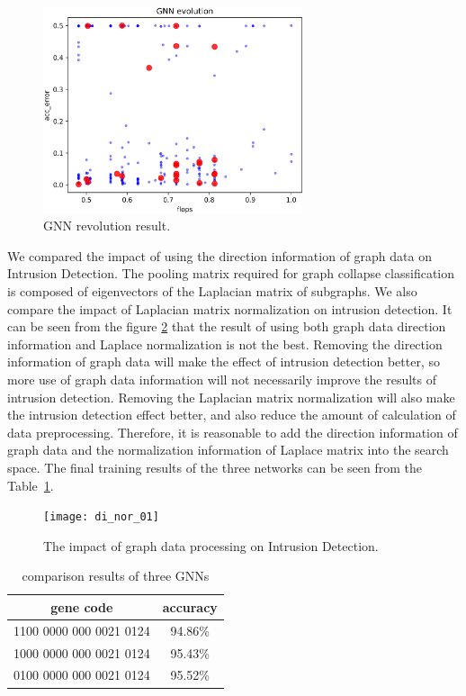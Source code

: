 \documentclass[lettersize,journal]{IEEEtran}
\begin{document}
\begin{figure}[!t]
\centering
\includegraphics[width=3in]{gnn_evo}
\caption{GNN revolution result.}
\label{fig_10}
\end{figure}

We compared the impact of using the direction information of graph data on Intrusion Detection. The pooling matrix required for graph collapse classification is composed of eigenvectors of the Laplacian matrix of subgraphs. We also compare the impact of Laplacian matrix normalization on intrusion detection. It can be seen from the figure \ref{fig_11} that the result of using both graph data direction information and Laplace normalization is not the best. Removing the direction information of graph data will make the effect of intrusion detection better, so more use of graph data information will not necessarily improve the results of intrusion detection. Removing the Laplacian matrix normalization will also make the intrusion detection effect better, and also reduce the amount of calculation of data preprocessing. Therefore, it is reasonable to add the direction information of graph data and the normalization information of Laplace matrix into the search space. The final training results of the three networks can be seen from the Table~\ref{table4}.


\begin{figure}[!t]
\centering
\texttt{[image: di\_nor\_01]}
\caption{The impact of graph data processing on Intrusion Detection.}
\label{fig_11}
\end{figure}

\begin{table}[!t]
\caption{comparison results of three GNNs\label{table4}}
\centering
\begin{tabular}{cc}
\hline
gene code & accuracy	\\
\hline
1100 0000 000 0021 0124 &  94.86\%\\
1000 0000 000 0021 0124 & 95.43\%\\
0100 0000 000 0021 0124 & 95.52\%\\
\hline
\end{tabular}
\end{table}
\end{document}

